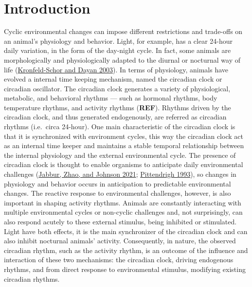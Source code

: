 \documentclass[msc,numbers,hidelinks]{coppe}
\begin{document}
  \hypertarget{introduction}{%
  \section{Introduction}\label{introduction}}

  Cyclic environmental changes can impose different restrictions and trade-offs on an animal's physiology and behavior. Light, for example, has a clear 24-hour daily variation, in the form of the day-night cycle. In fact, some animals are morphologically and physiologically adapted to the diurnal or nocturnal way of life (\protect\hyperlink{ref-kronfeld-schor2003}{Kronfeld-Schor and Dayan 2003}). In terms of physiology, animals have evolved a internal time keeping mechanism, named the circadian clock or circadian oscillator. The circadian clock generates a variety of physiological, metabolic, and behavioral rhythms --- such as hormonal rhythms, body temperature rhythms, and activity rhythms (\textbf{REF}). Rhythms driven by the circadian clock, and thus generated endogenously, are referred as circadian rhythms (i.e.~circa 24-hour). One main characteristic of the circadian clock is that it is synchronized with environment cycles, this way the circadian clock act as an internal time keeper and maintains a stable temporal relationship between the internal physiology and the external environmental cycle. The presence of circadian clock is thought to enable organisms to anticipate daily environmental challenges (\protect\hyperlink{ref-Jabbur2021}{Jabbur, Zhao, and Johnson 2021}; \protect\hyperlink{ref-pittendrigh1993}{Pittendrigh 1993}), so changes in physiology and behavior occurs in anticipation to predictable environmental changes. The reactive response to environmental challenges, however, is also important in shaping activity rhythms. Animals are constantly interacting with multiple environmental cycles or non-cyclic challenges and, not surprisingly, can also respond acutely to these external stimulus, being inhibited or stimulated. Light have both effects, it is the main synchronizer of the circadian clock and can also inhibit nocturnal animals' activity. Consequently, in nature, the observed circadian rhythm, such as the activity rhythm, is an outcome of the influence and interaction of these two mechanisms: the circadian clock, driving endogenous rhythms, and from direct response to environmental stimulus, modifying existing circadian rhythms.
\end{document}
